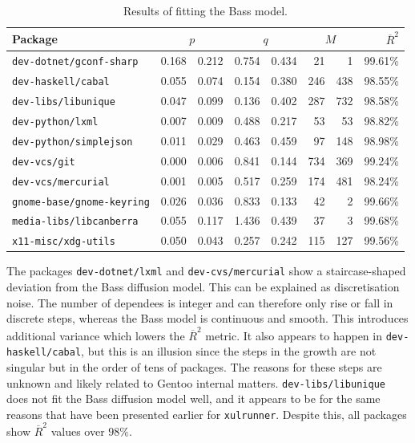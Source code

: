 \documentclass[smallextended,final]{svjour3}
\begin{document}
\begin{table}
\small\centering
\caption{Results of fitting the Bass model.}\label{tbl:testresults}
\begin{tabular}{lr@{ $\pm$}rr@{ $\pm$}rr@{ $\pm$}rr}
\toprule
Package & \multicolumn{2}{c}{$p$} & \multicolumn{2}{c}{$q$} & \multicolumn{2}{c}{$M$} & $\overline{R}^2$\\
\midrule
\texttt{dev-dotnet/gconf-sharp}   & 0.168 & 0.212 & 0.754 & 0.434 &  21 &   1 & 99.61\%\\
\texttt{dev-haskell/cabal}        & 0.055 & 0.074 & 0.154 & 0.380 & 246 & 438 & 98.55\%\\
\texttt{dev-libs/libunique}       & 0.047 & 0.099 & 0.136 & 0.402 & 287 & 732 & 98.58\%\\
\texttt{dev-python/lxml}          & 0.007 & 0.009 & 0.488 & 0.217 &  53 &  53 & 98.82\%\\
\texttt{dev-python/simplejson}    & 0.011 & 0.029 & 0.463 & 0.459 &  97 & 148 & 98.98\%\\
\texttt{dev-vcs/git}              & 0.000 & 0.006 & 0.841 & 0.144 & 734 & 369 & 99.24\%\\
\texttt{dev-vcs/mercurial}        & 0.001 & 0.005 & 0.517 & 0.259 & 174 & 481 & 98.24\%\\
\texttt{gnome-base/gnome-keyring} & 0.026 & 0.036 & 0.833 & 0.133 &  42 &   2 & 99.66\%\\
\texttt{media-libs/libcanberra}   & 0.055 & 0.117 & 1.436 & 0.439 &  37 &   3 & 99.68\%\\
\texttt{x11-misc/xdg-utils}       & 0.050 & 0.043 & 0.257 & 0.242 & 115 & 127 & 99.56\%\\
\bottomrule
\end{tabular}
\end{table}

The packages \texttt{dev-dotnet/lxml} and \texttt{dev-cvs/mercurial} show a staircase-shaped deviation from the Bass diffusion model. This can be explained as discretisation noise. The number of dependees is integer and can therefore only rise or fall in discrete steps, whereas the Bass model is continuous and smooth. This introduces additional variance which lowers the $\overline{R}^2$ metric. It also appears to happen in \texttt{dev-haskell/cabal}, but this is an illusion since the steps in the growth are not singular but in the order of tens of packages. The reasons for these steps are unknown and likely related to Gentoo internal matters. \texttt{dev-libs/libunique} does not fit the Bass diffusion model well, and it appears to be for the same reasons that have been presented earlier for \texttt{xulrunner}. Despite this, all packages show $\overline{R}^2$ values over $98\%$.
\end{document}
